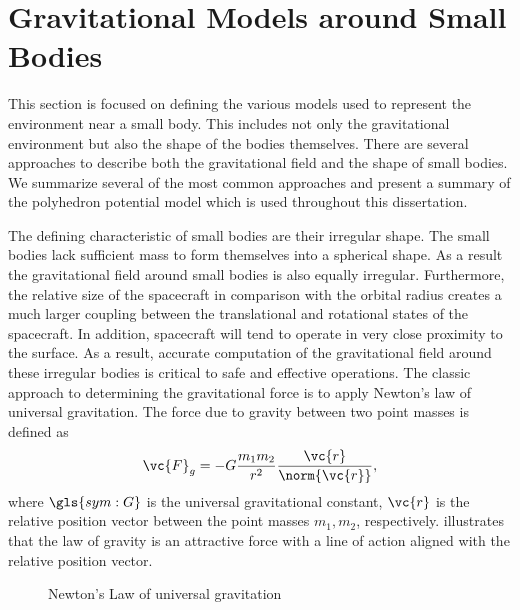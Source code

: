 \section{Gravitational Models around Small Bodies}\label{sec:gravitational_models}
This section is focused on defining the various models used to represent the environment near a small body.
This includes not only the gravitational environment but also the shape of the bodies themselves.
There are several approaches to describe both the gravitational field and the shape of small bodies.
We summarize several of the most common approaches and present a summary of the polyhedron potential model which is used throughout this dissertation.

The defining characteristic of small bodies are their irregular shape.
The small bodies lack sufficient mass to form themselves into a spherical shape.
As a result the gravitational field around small bodies is also equally irregular.
Furthermore, the relative size of the spacecraft in comparison with the orbital radius creates a much larger coupling between the translational and rotational states of the spacecraft.
In addition, spacecraft will tend to operate in very close proximity to the surface.
As a result, accurate computation of the gravitational field around these irregular bodies is critical to safe and effective operations.
The classic approach to determining the gravitational force is to apply Newton's law of universal gravitation.
The force due to gravity between two point masses is defined as
\begin{align}\label{eq:newton_universal_gravitation}
    \vc{F}_g =  - G \frac{m_1 m_2}{r^2} \frac{\vc{r}}{\norm{\vc{r}}},
\end{align}
where \( \gls{sym:G} \) is the universal gravitational constant, \( \vc{r} \) is the relative position vector between the point masses \( m_1, m_2\), respectively.
 illustrates that the law of gravity is an attractive force with a line of action aligned with the relative position vector.
\begin{figure}
    \centering
    
    \caption{Newton's Law of universal gravitation~\label{fig:universal_gravity}}
\end{figure}

